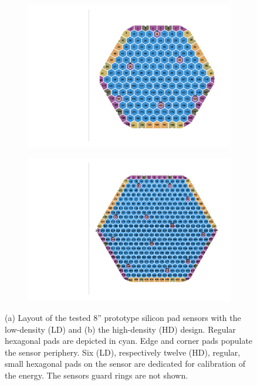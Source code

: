 \begin{figure}
	\captionsetup[subfigure]{aboveskip=-1pt,belowskip=-1pt}
	\centering
	\begin{subfigure}[b]{0.50\textwidth}
		\includegraphics[width=0.999\textwidth]{plots/ch_mapping/LD.pdf}
		\subcaption{
		}
	\end{subfigure}
	\hfill
	\begin{subfigure}[b]{0.48\textwidth}
		\includegraphics[width=0.999\textwidth]{plots/ch_mapping/HD.pdf}
		\subcaption{
		}
	\end{subfigure}    
	\caption{
        (a) Layout of the tested 8'' prototype silicon pad sensors with the low-density (LD) and (b) the high-density (HD) design.
		Regular hexagonal pads are depicted in cyan. 
		Edge and corner pads populate the sensor periphery. 
		Six (LD), respectively twelve (HD), regular, small hexagonal pads on the sensor are dedicated for calibration of the energy.
		The sensors guard rings are not shown.
	}
	\label{fig:Sensors}
\end{figure}
